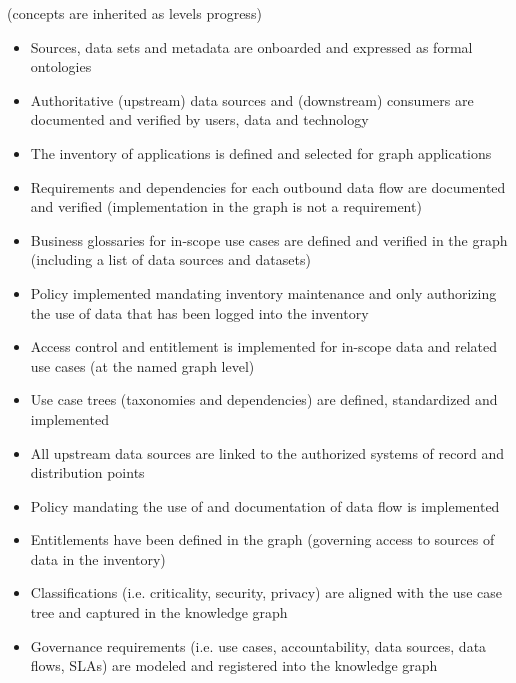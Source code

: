 \kgmmscoringsection

(concepts are inherited as levels progress)

\kgmmscoringlevelOne

\begin{itemize}[leftmargin=1.5in]
  \item Sources, data sets and metadata are onboarded and expressed as formal ontologies
  \item Authoritative (upstream) data sources and (downstream) consumers are documented and verified by users,
        data and technology
  \item The inventory of applications is defined and selected for graph applications
  \item Requirements and dependencies for each outbound data flow are documented and verified (implementation in the
        graph is not a requirement)
  \item Business glossaries for in-scope use cases are defined and verified in the graph (including a list of
        data sources and datasets)
  \item Policy implemented mandating inventory maintenance and only authorizing the use of data that has been logged
        into the inventory
  \item Access control and entitlement is implemented for in-scope data and related use cases (at the named graph level)
\end{itemize}

\kgmmscoringlevelTwo

\begin{itemize}[leftmargin=1.5in]
  \item Use case trees (taxonomies and dependencies) are defined, standardized and implemented
  \item All upstream data sources are linked to the authorized systems of record and distribution points
  \item Policy mandating the use of  and documentation of data flow is implemented
  \item Entitlements have been defined in the graph (governing access to sources of data in the inventory)
  \item Classifications (i.e. criticality, security, privacy) are aligned with the use case tree and captured in the
        knowledge graph
  \item Governance requirements (i.e. use cases, accountability, data sources, data flows, SLAs) are modeled and
        registered into the knowledge graph
\end{itemize}

